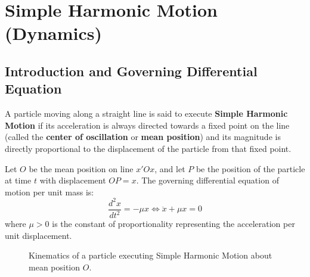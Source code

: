 \chapter{Simple Harmonic Motion (Dynamics)}

\section{Introduction and Governing Differential Equation}

\begin{defbox}
A particle moving along a straight line is said to execute \textbf{Simple Harmonic Motion} if its acceleration is always directed towards a fixed point on the line (called the \textbf{center of oscillation} or \textbf{mean position}) and its magnitude is directly proportional to the displacement of the particle from that fixed point.
\end{defbox}

Let $O$ be the mean position on line $x' O x$, and let $P$ be the position of the particle at time $t$ with displacement $OP = x$.
The governing differential equation of motion per unit mass is:
\begin{equation}
    \frac{d^2 x}{d t^2} = -\mu x \iff \ddot{x} + \mu x = 0
\end{equation}
where $\mu > 0$ is the constant of proportionality representing the acceleration per unit displacement.

\begin{figure}[htbp]
\centering
{}
\caption{Kinematics of a particle executing Simple Harmonic Motion about mean position $O$.}
\end{figure}

